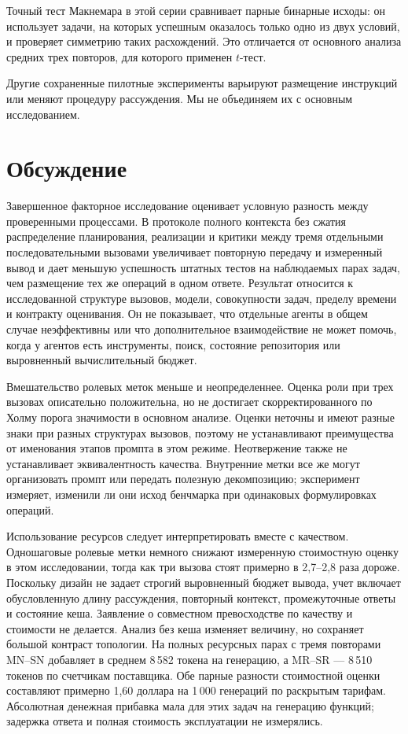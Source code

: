 

Точный тест Макнемара в этой серии сравнивает парные бинарные исходы: он использует задачи, на которых успешным оказалось только одно из двух условий, и проверяет симметрию таких расхождений. Это отличается от основного анализа средних трех повторов, для которого применен $t$-тест.

Другие сохраненные пилотные эксперименты варьируют размещение инструкций или меняют процедуру рассуждения. Мы не объединяем их с основным исследованием.



\FloatBarrier
\section{Обсуждение}
Завершенное факторное исследование оценивает условную разность между проверенными процессами. В протоколе полного контекста без сжатия распределение планирования, реализации и критики между тремя отдельными последовательными вызовами увеличивает повторную передачу и измеренный вывод и дает меньшую успешность штатных тестов на наблюдаемых парах задач, чем размещение тех же операций в одном ответе. Результат относится к исследованной структуре вызовов, модели, совокупности задач, пределу времени и контракту оценивания. Он не показывает, что отдельные агенты в общем случае неэффективны или что дополнительное взаимодействие не может помочь, когда у агентов есть инструменты, поиск, состояние репозитория или выровненный вычислительный бюджет.

Вмешательство ролевых меток меньше и неопределеннее. Оценка роли при трех вызовах описательно положительна, но не достигает скорректированного по Холму порога значимости в основном анализе. Оценки неточны и имеют разные знаки при разных структурах вызовов, поэтому не устанавливают преимущества от именования этапов промпта в этом режиме. Неотвержение также не устанавливает эквивалентность качества. Внутренние метки все же могут организовать промпт или передать полезную декомпозицию; эксперимент измеряет, изменили ли они исход бенчмарка при одинаковых формулировках операций.

Использование ресурсов следует интерпретировать вместе с качеством. Одношаговые ролевые метки немного снижают измеренную стоимостную оценку в этом исследовании, тогда как три вызова стоят примерно в 2,7--2,8 раза дороже. Поскольку дизайн не задает строгий выровненный бюджет вывода, учет включает обусловленную длину рассуждения, повторный контекст, промежуточные ответы и состояние кеша. Заявление о совместном превосходстве по качеству и стоимости не делается. Анализ без кеша изменяет величину, но сохраняет большой контраст топологии. На полных ресурсных парах с тремя повторами MN--SN добавляет в среднем 8\,582 токена на генерацию, а MR--SR --- 8\,510 токенов по счетчикам поставщика. Обе парные разности стоимостной оценки составляют примерно 1,60 доллара на 1\,000 генераций по раскрытым тарифам. Абсолютная денежная прибавка мала для этих задач на генерацию функций; задержка ответа и полная стоимость эксплуатации не измерялись.

